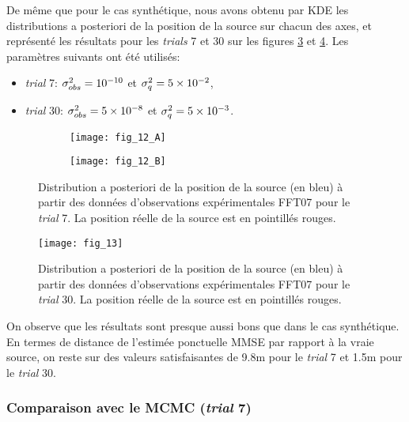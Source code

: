 De même que pour le cas synthétique, nous avons {obtenu} par KDE les distributions a posteriori de la position de la source sur chacun des axes, et représenté les résultats pour les \textit{trials} 7 et 30 sur les figures \ref{fig_12_AE} et \ref{fig_13_AE}. Les paramètres suivants ont été utilisés:

\begin{itemize}
	\item \textit{trial} 7: ${\sigma_{obs}^2} = 10^{-10}$ et $\sigma_q^2 = 5\times 10^{-2}$,
	\item \textit{trial} 30: ${\sigma_{obs}^2} = 5 \times 10^{-8}$ et $\sigma_q^2 = 5\times 10^{-3}$.\\
\end{itemize}

\begin{figure}[h!]
	\centering
	\begin{subfigure}[t]{0.5\textwidth}
		\centering
		\texttt{[image: fig\_12\_A]}
		\caption{}
		\label{fig_12_A}
	\end{subfigure}%
	\begin{subfigure}[t]{0.5\textwidth}
		\centering
		\texttt{[image: fig\_12\_B]}
		\caption{}
		\label{fig_12_B}
	\end{subfigure}
	\caption{Distribution a posteriori de la position de la source (en bleu) à partir des données d'observations expérimentales FFT07 pour le \textit{trial} 7. La position réelle de la source est en pointillés rouges.} 
	\label{fig_12_AE}		
\end{figure}

\begin{figure}[h!]
	\centering
	\texttt{[image: fig\_13]}
	\caption{Distribution a posteriori de la position de la source (en bleu) à partir des données d'observations expérimentales FFT07 pour le \textit{trial} 30. La position réelle de la source est en pointillés rouges.}
	\label{fig_13_AE}
\end{figure}

On observe que les résultats sont presque aussi bons que dans le cas synthétique. En termes de distance de l'estimée ponctuelle MMSE par rapport à la vraie source, on reste sur des valeurs satisfaisantes de 9.8m pour le \textit{trial} 7 et 1.5m pour le \textit{trial} 30. 

\subsubsection{Comparaison avec le MCMC (\textit{trial} 7)}

